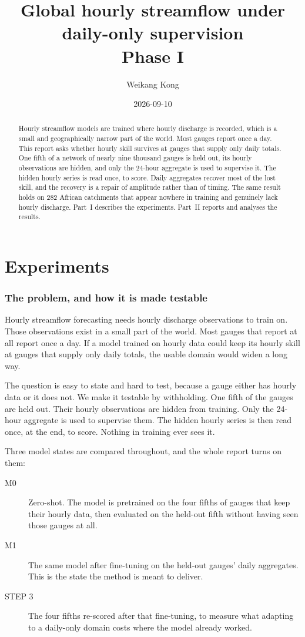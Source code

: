\documentclass[11pt,a4paper]{article}
\title{Global hourly streamflow under daily-only supervision\\[0.3em]
  \large Phase I}
\author{Weikang Kong}
\date{2026-09-10}
\begin{document}
\maketitle
\begin{abstract}
\noindent
Hourly streamflow models are trained where hourly discharge is recorded, which is a small
and geographically narrow part of the world. Most gauges report once a day. This report
asks whether hourly skill survives at gauges that supply only daily totals. One fifth of a
network of nearly nine thousand gauges is held out, its hourly observations are hidden, and
only the 24-hour aggregate is used to supervise it. The hidden hourly series is read once,
to score. Daily aggregates recover most of the lost skill, and the recovery is a repair of
amplitude rather than of timing. The same result holds on 282 African catchments that
appear nowhere in training and genuinely lack hourly discharge. Part~I describes the
experiments. Part~II reports and analyses the results.
\end{abstract}
\tableofcontents
\clearpage
\part{Experiments}

\section{The problem, and how it is made testable}\label{sec:problem}
Hourly streamflow forecasting needs hourly discharge observations to train on. Those observations exist in a small part of the world. Most gauges that report at all report once a day. If a model trained on hourly data could keep its hourly skill at gauges that supply only daily totals, the usable domain would widen a long way.

The question is easy to state and hard to test, because a gauge either has hourly data or it does not. We make it testable by withholding. One fifth of the gauges are held out. Their hourly observations are hidden from training. Only the 24-hour aggregate is used to supervise them. The hidden hourly series is then read once, at the end, to score. Nothing in training ever sees it.

Three model states are compared throughout, and the whole report turns on them:
\begin{description}
  \item[M0] Zero-shot. The model is pretrained on the four fifths of gauges that keep their hourly data, then evaluated on the held-out fifth without having seen those gauges at all.
  \item[M1] The same model after fine-tuning on the held-out gauges' daily aggregates. This is the state the method is meant to deliver.
  \item[STEP 3] The four fifths re-scored after that fine-tuning, to measure what adapting to a daily-only domain costs where the model already worked.
\end{description}
\end{document}
